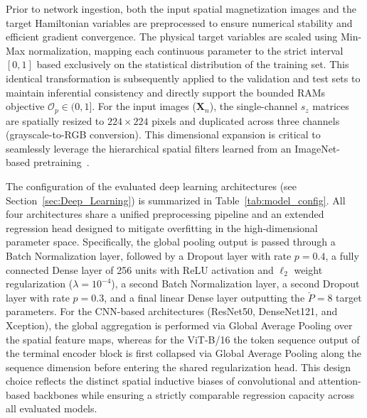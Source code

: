 \documentclass[a4paper,fleqn]{cas-sc}
\begin{document}
Prior to network ingestion, both the input spatial 
magnetization images and the target Hamiltonian 
variables are preprocessed to ensure numerical 
stability and efficient gradient convergence. The 
physical target variables are scaled using Min-Max 
normalization, mapping each continuous parameter to 
the strict interval $[0,1]$ based exclusively on the 
statistical distribution of the training set. This 
identical transformation is subsequently applied to 
the validation and test sets to maintain inferential 
consistency and directly support the bounded RAMs 
objective $\mathcal{O}_p \in (0,1]$. For the input 
images ($\mathbf{X}_n$), the single-channel $s_z$ 
matrices are spatially resized to $224 \times 224$ 
pixels and duplicated across three channels 
(grayscale-to-RGB conversion). This dimensional 
expansion is critical to seamlessly leverage the 
hierarchical spatial filters learned from an 
ImageNet-based pretraining~\cite{radosavovic2023real}.

The configuration of the evaluated deep learning 
architectures (see Section~\ref{sec:Deep_Learning}) 
is summarized in Table~\ref{tab:model_config}. All 
four architectures share a unified preprocessing 
pipeline and an extended regression head designed 
to mitigate overfitting in the high-dimensional 
parameter space. Specifically, the global pooling 
output is passed through a Batch Normalization layer, 
followed by a Dropout layer with rate $p = 0.4$, a 
fully connected Dense layer of 256 units with ReLU 
activation and $\ell_2$ weight regularization 
($\lambda = 10^{-4}$), a second Batch Normalization 
layer, a second Dropout layer with rate $p = 0.3$, 
and a final linear Dense layer outputting the 
$\breve{P} = 8$ target parameters. For the 
CNN-based architectures (ResNet50, DenseNet121, and 
Xception), the global aggregation is performed via 
Global Average Pooling over the spatial feature maps, 
whereas for the ViT-B/16 the token sequence output 
of the terminal encoder block is first collapsed via 
Global Average Pooling along the sequence dimension 
before entering the shared regularization head. This 
design choice reflects the distinct spatial inductive 
biases of convolutional and attention-based backbones 
while ensuring a strictly comparable regression 
capacity across all evaluated models.
\end{document}
